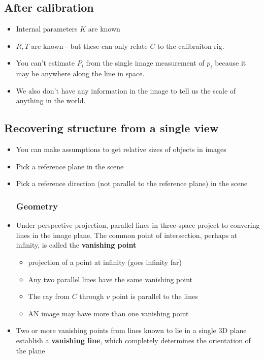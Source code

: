 \subsection{After calibration}
\begin{itemize}
	\item Internal parameters $K$ are known
	\item $R, T$ are known - but these can only relate $C$ to the calibraiton rig.
	\item You can't estimate $P_i$ from the single image measurement of $p_i$ because it may be anywhere along the line in space.
	\item We also don't have any information in the image to tell us the scale of anything in the world.
\end{itemize}

\subsection{Recovering structure from a single view}
\begin{itemize}
	\item You can make assumptions to get relative sizes of objects in images
	\item Pick a reference plane in the scene
	\item Pick a reference direction (not parallel to the reference plane) in the scene
	\subsubsection{Geometry}
	\item Under perspective projection, parallel lines in three-space project to convering lines in the image plane. The common point of intersection, perhaps at infinity, is called the \textbf{vanishing point}
	\begin{itemize}
		\item projection of a point at infinity (goes infinity far)
		\item Any two parallel lines have the same vanishing point
		\item The ray from $C$ through $v$ point is parallel to the lines
		\item AN image may have more than one vanishing point
	\end{itemize}
	\item Two or more vanishing points from lines known to lie in a single 3D plane establish a \textbf{vanishing line}, which completely determines the orientation of the plane
\end{itemize}

